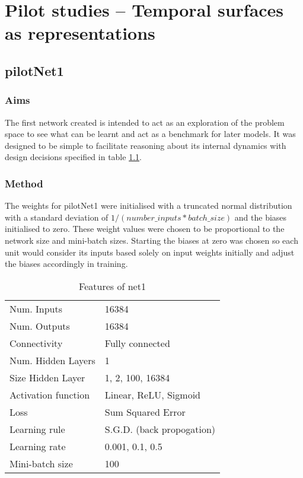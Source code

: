 \chapter{Pilot studies -- Temporal surfaces as representations}
\label{ch:pilot}

\section{pilotNet1}


\subsection{Aims}
The first network created is intended to act as an exploration of the problem space to see what can be learnt and act as a benchmark for later models. 
It was designed to be simple to facilitate reasoning about its internal dynamics with design decisions specified in table \ref{table:net1def}.


\subsection{Method}
The weights for pilotNet1 were initialised with a truncated normal distribution with a standard deviation of $1 / ( number\_inputs * batch\_size )$ and the biases initialised to zero.
These weight values were chosen to be proportional to the network size and mini-batch sizes. 
Starting the biases at zero was chosen so each unit would consider its inputs based solely on input weights initially and adjust the biases accordingly in training. 

\begin{table}[h]
\centering
\begin{tabular}{ | l | l | }
    \hline
    Num. Inputs & 16384 \\
    Num. Outputs & 16384 \\
    Connectivity & Fully connected \\
    Num. Hidden Layers & 1 \\
    Size Hidden Layer & 1, 2, 100, 16384  \\
    Activation function & Linear, ReLU, Sigmoid \\
    Loss & Sum Squared Error \\
    Learning rule & S.G.D. (back propogation) \\
    Learning rate & 0.001, 0.1, 0.5 \\
    Mini-batch size & 100 \\
    \hline
\end{tabular}
\caption{Features of net1}
\label{table:net1def}
\end{table}

